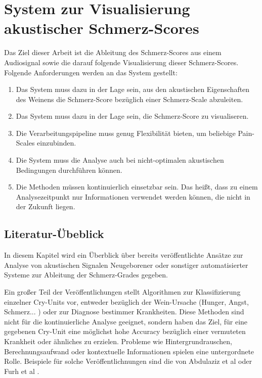 \chapter{System zur Visualisierung akustischer Schmerz-Scores}


Das Ziel dieser Arbeit ist die Ableitung des Schmerz-Scores aus einem Audiosignal sowie die darauf folgende Visualisierung dieser Schmerz-Scores. Folgende Anforderungen werden an das System gestellt:
\begin{enumerate}
	\item Das System muss dazu in der Lage sein, aus den akustischen Eigenschaften des Weinens die Schmerz-Score bezüglich einer Schmerz-Scale abzuleiten.
	\item Das System muss dazu in der Lage sein, die Schmerz-Score zu visualiseren.
	\item Die Verarbeitungspipeline muss genug Flexibilität bieten, um beliebige Pain-Scales einzubinden. 
	\item Die System muss die Analyse auch bei nicht-optimalen akustischen Bedingungen durchführen können.
	\item Die Methoden müssen kontinuierlich einsetzbar sein. Das heißt, dass zu einem Analysezeitpunkt nur Informationen verwendet werden können, die nicht in der Zukunft liegen.
\end{enumerate}

\section{Literatur-Übeblick}
\label{sec:system_literature}

In diesem Kapitel wird ein Überblick über bereits veröffentlichte Ansätze zur Analyse von akustischen Signalen Neugeborener oder sonstiger automatisierter Systeme zur Ableitung der Schmerz-Grades gegeben.

Ein großer Teil der Veröffentlichungen stellt Algorithmen zur Klassifizierung einzelner Cry-Units vor, entweder bezüglich der Wein-Ursache (Hunger, Angst, Schmerz... ) oder zur Diagnose bestimmer Krankheiten. Diese Methoden sind nicht für die kontinuierliche Analyse geeignet, sondern haben das Ziel, für eine gegebenen Cry-Unit eine möglichst hohe Accuracy bezüglich einer vermuteten Krankheit oder ähnliches zu erzielen. Probleme wie Hintergrundrauschen, Berechnungsaufwand oder kontextuelle Informationen spielen eine untergordnete Rolle. Beispiele für solche Veröffentlichnungen sind die von Abdulaziz et al \cite{class_abdulaziz} oder Furh et al \cite{comparisonOfLearning}.

